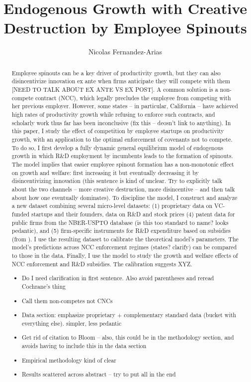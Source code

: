 \documentclass[11pt,english]{article}
\theoremstyle{remark}
\begin{document}
	
\title{Endogenous Growth with Creative Destruction by Employee Spinouts}
\author{Nicolas Fernandez-Arias}
\maketitle

\begin{abstract}
	Employee spinouts can be a key driver of productivity growth, but they can also disincentivize innovation ex ante when firms anticipate they will compete with them [NEED TO TALK ABOUT EX ANTE VS EX POST]. A common solution is a non-compete contract (NCC), which legally precludes the employee from competing with her previous employer. However, some states -- in particular, California -- have achieved high rates of productivity growth while refusing to enforce such contracts, and scholarly work thus far has been inconclusive (fix this -- deosn't link to anything). In this paper, I study the effect of competition by employee startups on productivity growth, with an application to the optimal enforcement of covenants not to compete. To do so, I first develop a fully dynamic general equilibrium model of endogenous growth in which R\&D employment by incumbents leads to the formation of spinouts. The model implies that easier employee spinout formation has a non-monotonic effect on growth and welfare: first increasing it but eventually decreasing it by disincentivizing innovation (this sentence is kind of unclear. Try to explicitly talk about the two channels -- more creative destruction, more disincentive -- and then talk about how one eventually dominates). To discipline the model, I construct and analyze a new dataset combining several micro-level datasets: (1) proprietary data on VC-funded startups and their founders, data on R\&D and stock prices (4) patent data for public firms from the NBER-USPTO database (is this too standard to name? looks pedantic), and (5) firm-specific instruments for R\&D expenditure based on subsidies (from \cite{bloom_identifying_2013}). I use the resulting dataset to calibrate the theoretical model's parameters. The model's predictions across NCC enforcement regimes (states? clarify) can be compared to those in the data. Finally, I use the model to study the growth and welfare effects of NCC enforcement and R\&D subsidies. The calibration suggests XYZ.
\begin{itemize}
	\item Do I need clarification in first sentence. Also avoid parentheses and reread Cochrane's thing
	\item Call them non-competes not CNCs 
	\item Data section: emphasize proprietary + complementary standard data (bucket with everything else). simpler, less pedantic
	\item Get rid of citation to Bloom -- also, this could be in the methodology section, and avoids having to include this in the data section 
	\item Empirical methodology kind of clear
	\item Results scattered across abstract -- try to put all in the end 
\end{itemize}
			

\end{abstract}
\end{document}
